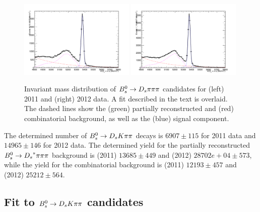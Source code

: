 \begin{figure}[h]
\includegraphics[height=7.cm,width=0.49\textwidth]{figs/3pi_BmassFit_11.pdf}
\includegraphics[height=7.cm,width=0.49\textwidth]{figs/3pi_BmassFit_12.pdf}
\caption{Invariant mass distribution of ${{B}^0_{s}}\rightarrow{\ensuremath{{D}_{s}}}{\ensuremath{\pi}}{\ensuremath{\pi}}{\ensuremath{\pi}}$ candidates for (left) 2011 and (right) 2012 data.
A fit described in the text is overlaid. The dashed lines show the (green) partially reconstructed and (red) combinatorial background, as well as the (blue) signal component.}
\label{fig: BsDs3piFit}
\end{figure}

The determined number of ${{B}^0_{s}}\rightarrow{\ensuremath{{D}_{s}}}{\ensuremath{K}}{\ensuremath{\pi}}{\ensuremath{\pi}}$ decays is $6907 \pm 115$ for 2011 data and $14965 \pm 146$ for 2012 data. 
The determined yield for the partially reconstructed ${{B}^0_{s}}\rightarrow{\ensuremath{{D}_{s}}}^{*}{\pi}{\pi}{\pi}$ background is  (2011) $13685 \pm 449$ and (2012)  $28702e+04 \pm 573$, 
while the yield for the combinatorial background is (2011) $12193 \pm 457$ and (2012) $25212 \pm 564$.



\subsection{Fit to ${{B}^0_{s}}\rightarrow{\ensuremath{{D}_{s}}}{\ensuremath{K}}{\ensuremath{\pi}}{\ensuremath{\pi}}$ candidates}
\label{subsec: SigFit}

